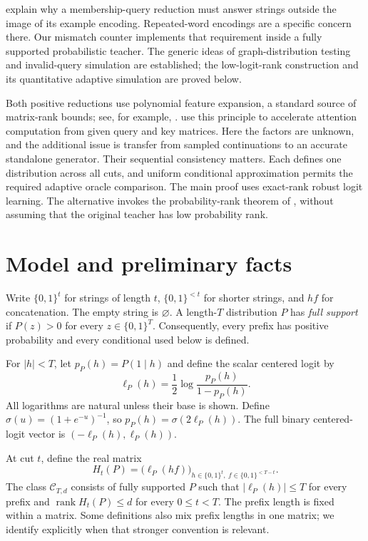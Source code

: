 \documentclass[11pt]{article}
\newcommand{\rank}{\operatorname{rank}}
\theoremstyle{definition}
\theoremstyle{remark}
\begin{document}
\citet[Section~3]{angluin} explain why a membership-query reduction must answer strings outside the image of its example encoding. Repeated-word encodings are a specific concern there. Our mismatch counter implements that requirement inside a fully supported probabilistic teacher. The generic ideas of graph-distribution testing and invalid-query simulation are established; the low-logit-rank construction and its quantitative adaptive simulation are proved below.

Both positive reductions use polynomial feature expansion, a standard source of matrix-rank bounds; see, for example, \citet[Example~1.2]{budzinskiy}. \citet[Lemma~3.2]{alman-song} use this principle to accelerate attention computation from given query and key matrices. Here the factors are unknown, and the additional issue is transfer from sampled continuations to an accurate standalone generator. Their sequential consistency matters. Each defines one distribution across all cuts, and uniform conditional approximation permits the required adaptive oracle comparison. The main proof uses exact-rank robust logit learning. The alternative invokes the probability-rank theorem of \citet{liu-moitra}, without assuming that the original teacher has low probability rank.


\section{Model and preliminary facts}\label{sec:model}

Write $\{0,1\}^t$ for strings of length $t$, $\{0,1\}^{<t}$ for shorter strings, and $hf$ for concatenation. The empty string is $\varnothing$. A length-$T$ distribution $P$ has \emph{full support} if $P(z)>0$ for every $z\in\{0,1\}^T$. Consequently, every prefix has positive probability and every conditional used below is defined.

For $|h|<T$, let $p_P(h)=P(1\mid h)$ and define the scalar centered logit by
\[
\ell_P(h)=\frac12\log\frac{p_P(h)}{1-p_P(h)}.
\]
All logarithms are natural unless their base is shown. Define $\sigma(u)=(1+e^{-u})^{-1}$, so $p_P(h)=\sigma(2\ell_P(h))$. The full binary centered-logit vector is $(-\ell_P(h),\ell_P(h))$.

At cut $t$, define the real matrix
\[
H_t(P)=\bigl(\ell_P(hf)\bigr)_{
h\in\{0,1\}^t,\ f\in\{0,1\}^{<T-t}}.
\]
The class $\mathcal C_{T,d}$ consists of fully supported $P$ such that $|\ell_P(h)|\le T$ for every prefix and $\rank H_t(P)\le d$ for every $0\le t<T$. The prefix length is fixed within a matrix. Some definitions also mix prefix lengths in one matrix; we identify explicitly when that stronger convention is relevant.
\end{document}
